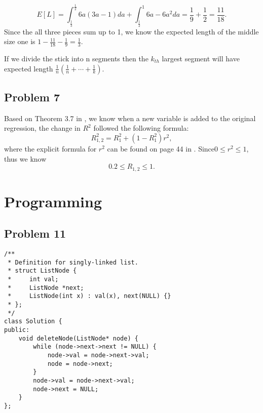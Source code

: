 \documentclass[11pt]{article}
\theoremstyle{remark}
\begin{document}
\begin{equation}
E[L]=\int_{\frac{1}{3}}^{\frac{1}{2}}6a(3a-1)da + \int_{\frac{1}{2}}^{1}6a-6a^{2}da = \frac{1}{9}+\frac{1}{2}=\frac{11}{18}.\nonumber 
\end{equation}
Since the all three pieces sum up to 1, we know the expected length of the middle size one is $1-\frac{11}{18}-\frac{1}{9}=\frac{1}{3}$.




If we divide the stick into n segments then the $k_{th}$ largest segment will have expected length $\frac{1}{n}(\frac{1}{n}+\cdots+\frac{1}{k})$\cite{os}\cite{stack}.

\subsection{Problem 7}

Based on Theorem 3.7 in \cite{es}, we know when a new variable is added to the original regression, the change in $R^{2}$ followed the following formula:
\begin{equation}
R_{1,2}^{2}=R_{1}^{2} + (1-R_{1}^{2})r^{2}, 
\end{equation}
where the explicit formula for $r^{2}$ can be found on page 44 in \cite{es}. Since$0\leq r^{2}\leq 1$, thus we know
\begin{equation}
0.2\leq R_{1,2}\leq 1.
\end{equation}





\section{Programming}
\subsection{Problem 11}
\begin{lstlisting}
/**
 * Definition for singly-linked list.
 * struct ListNode {
 *     int val;
 *     ListNode *next;
 *     ListNode(int x) : val(x), next(NULL) {}
 * };
 */
class Solution {
public:
    void deleteNode(ListNode* node) {
        while (node->next->next != NULL) {
            node->val = node->next->val;
            node = node->next;
        }
        node->val = node->next->val;
        node->next = NULL;
    }
};

\end{lstlisting}
\end{document}
